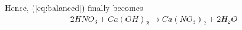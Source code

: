 \documentclass[journal,12pt,twocolumn]{IEEEtran}
\begin{document}
\hfill\break
Hence, (\ref{eq:balanced}) finally becomes
\begin{align}
    2HNO_{3}+ Ca(OH)_{2}\to Ca(NO_{3})_{2}+ 2H_{2}O
\end{align}
%
%
%
%
%
\end{document}

